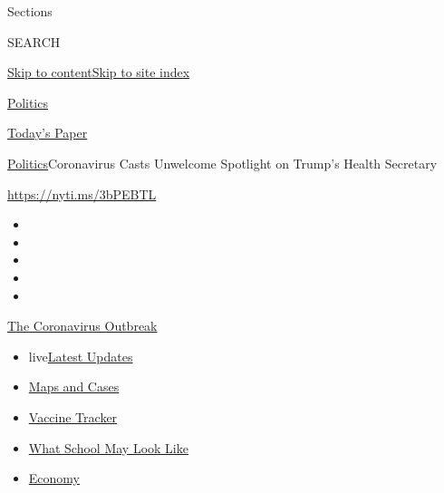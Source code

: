 Sections

SEARCH

\protect\hyperlink{site-content}{Skip to
content}\protect\hyperlink{site-index}{Skip to site index}

\href{https://www.nytimes.com/section/politics}{Politics}

\href{https://myaccount.nytimes.com/auth/login?response_type=cookie\&client_id=vi}{}

\href{https://www.nytimes.com/section/todayspaper}{Today's Paper}

\href{/section/politics}{Politics}\textbar{}Coronavirus Casts Unwelcome
Spotlight on Trump's Health Secretary

\url{https://nyti.ms/3bPEBTL}

\begin{itemize}
\item
\item
\item
\item
\item
\end{itemize}

\href{https://www.nytimes.com/news-event/coronavirus?action=click\&pgtype=Article\&state=default\&region=TOP_BANNER\&context=storylines_menu}{The
Coronavirus Outbreak}

\begin{itemize}
\tightlist
\item
  live\href{https://www.nytimes.com/2020/08/02/world/coronavirus-updates.html?action=click\&pgtype=Article\&state=default\&region=TOP_BANNER\&context=storylines_menu}{Latest
  Updates}
\item
  \href{https://www.nytimes.com/interactive/2020/us/coronavirus-us-cases.html?action=click\&pgtype=Article\&state=default\&region=TOP_BANNER\&context=storylines_menu}{Maps
  and Cases}
\item
  \href{https://www.nytimes.com/interactive/2020/science/coronavirus-vaccine-tracker.html?action=click\&pgtype=Article\&state=default\&region=TOP_BANNER\&context=storylines_menu}{Vaccine
  Tracker}
\item
  \href{https://www.nytimes.com/interactive/2020/07/29/us/schools-reopening-coronavirus.html?action=click\&pgtype=Article\&state=default\&region=TOP_BANNER\&context=storylines_menu}{What
  School May Look Like}
\item
  \href{https://www.nytimes.com/live/2020/07/31/business/stock-market-today-coronavirus?action=click\&pgtype=Article\&state=default\&region=TOP_BANNER\&context=storylines_menu}{Economy}
\end{itemize}

